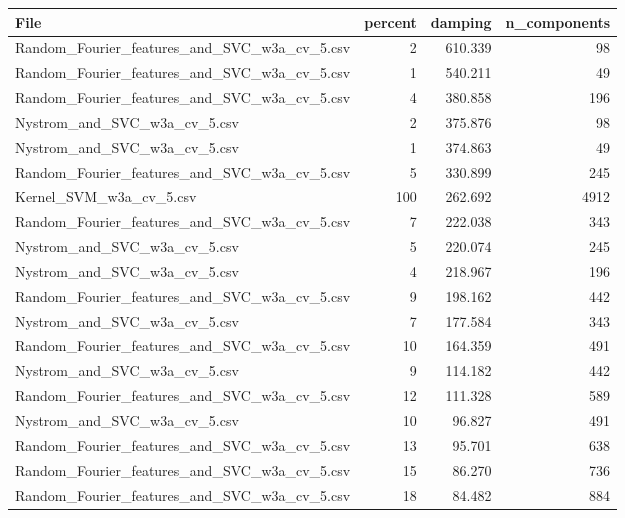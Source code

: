 \begin{tabularx}{\textwidth}{lrrr}
\toprule
                                        File &  percent &  damping &  n\_components \\
\midrule
Random\_Fourier\_features\_and\_SVC\_w3a\_cv\_5.csv &        2 &  610.339 &            98 \\
Random\_Fourier\_features\_and\_SVC\_w3a\_cv\_5.csv &        1 &  540.211 &            49 \\
Random\_Fourier\_features\_and\_SVC\_w3a\_cv\_5.csv &        4 &  380.858 &           196 \\
                Nystrom\_and\_SVC\_w3a\_cv\_5.csv &        2 &  375.876 &            98 \\
                Nystrom\_and\_SVC\_w3a\_cv\_5.csv &        1 &  374.863 &            49 \\
Random\_Fourier\_features\_and\_SVC\_w3a\_cv\_5.csv &        5 &  330.899 &           245 \\
                     Kernel\_SVM\_w3a\_cv\_5.csv &      100 &  262.692 &          4912 \\
Random\_Fourier\_features\_and\_SVC\_w3a\_cv\_5.csv &        7 &  222.038 &           343 \\
                Nystrom\_and\_SVC\_w3a\_cv\_5.csv &        5 &  220.074 &           245 \\
                Nystrom\_and\_SVC\_w3a\_cv\_5.csv &        4 &  218.967 &           196 \\
Random\_Fourier\_features\_and\_SVC\_w3a\_cv\_5.csv &        9 &  198.162 &           442 \\
                Nystrom\_and\_SVC\_w3a\_cv\_5.csv &        7 &  177.584 &           343 \\
Random\_Fourier\_features\_and\_SVC\_w3a\_cv\_5.csv &       10 &  164.359 &           491 \\
                Nystrom\_and\_SVC\_w3a\_cv\_5.csv &        9 &  114.182 &           442 \\
Random\_Fourier\_features\_and\_SVC\_w3a\_cv\_5.csv &       12 &  111.328 &           589 \\
                Nystrom\_and\_SVC\_w3a\_cv\_5.csv &       10 &   96.827 &           491 \\
Random\_Fourier\_features\_and\_SVC\_w3a\_cv\_5.csv &       13 &   95.701 &           638 \\
Random\_Fourier\_features\_and\_SVC\_w3a\_cv\_5.csv &       15 &   86.270 &           736 \\
Random\_Fourier\_features\_and\_SVC\_w3a\_cv\_5.csv &       18 &   84.482 &           884 \\

\end{tabularx}
